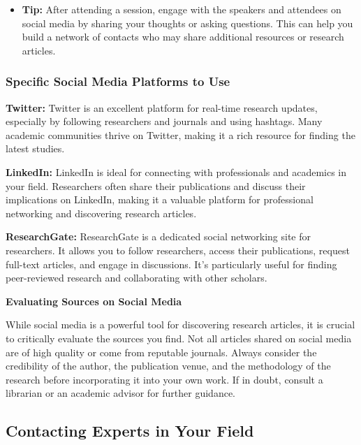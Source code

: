 \documentclass[
]{book}
\providecommand{\tightlist}{%
  \setlength{\itemsep}{0pt}\setlength{\parskip}{0pt}}
\begin{document}
\begin{itemize}
\tightlist
\item
  \textbf{Tip:} After attending a session, engage with the speakers and attendees on social media by sharing your thoughts or asking questions. This can help you build a network of contacts who may share additional resources or research articles.
\end{itemize}

\subsubsection*{Specific Social Media Platforms to Use}\label{specific-social-media-platforms-to-use}

\textbf{Twitter:} Twitter is an excellent platform for real-time research updates, especially by following researchers and journals and using hashtags. Many academic communities thrive on Twitter, making it a rich resource for finding the latest studies.

\textbf{LinkedIn:} LinkedIn is ideal for connecting with professionals and academics in your field. Researchers often share their publications and discuss their implications on LinkedIn, making it a valuable platform for professional networking and discovering research articles.

\textbf{ResearchGate:} ResearchGate is a dedicated social networking site for researchers. It allows you to follow researchers, access their publications, request full-text articles, and engage in discussions. It's particularly useful for finding peer-reviewed research and collaborating with other scholars.

\textbf{Evaluating Sources on Social Media}

While social media is a powerful tool for discovering research articles, it is crucial to critically evaluate the sources you find. Not all articles shared on social media are of high quality or come from reputable journals. Always consider the credibility of the author, the publication venue, and the methodology of the research before incorporating it into your own work. If in doubt, consult a librarian or an academic advisor for further guidance.

\subsection*{Contacting Experts in Your Field}\label{contacting-experts-in-your-field}
\end{document}
